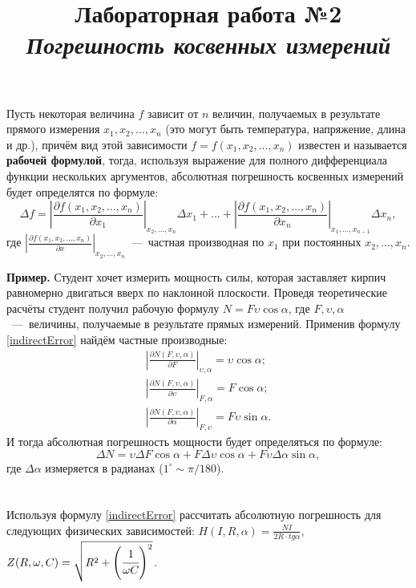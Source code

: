 \documentclass[14pt,a4paper]{article}
\title{Лабораторная работа №2 \\ \textit{Погрешность косвенных измерений}}
\begin{document}
\maketitle
Пусть некоторая величина $f$ зависит от $n$ величин, получаемых в результате прямого измерения  $x_1, x_2, \ldots, x_n$ (это могут быть температура, напряжение, длина и др.), причём вид этой зависимости $f = f(x_1, x_2, \ldots, x_n)$ известен и называется \textbf{рабочей формулой}, тогда, используя выражение для полного дифференциала функции нескольких аргументов, абсолютная погрешность косвенных измерений будет определятся по формуле:
\begin{equation} \label{indirectError}
    \Delta f = \left | \frac{\partial f(x_1, x_2, \ldots, x_n)}{\partial x_1} \right |_{x_2, \ldots, x_n} \Delta x_1 + \ldots + \left | \frac{\partial f(x_1, x_2, \ldots, x_n)}{\partial x_n} \right |_{x_1, \ldots, x_{n-1}} \Delta x_n,
\end{equation}
где $\left | \frac{\partial f(x_1, x_2, \ldots, x_n)}{\partial x} \right |_{x_2, \ldots, x_n}$~---~частная производная по $x_1$ при постоянных $x_2, \ldots, x_n$.

\textbf{Пример.}
Студент хочет измерить мощность силы, которая заставляет кирпич равномерно двигаться вверх по наклонной плоскости. Проведя теоретические расчёты студент получил рабочую формулу $N = F\upsilon\cos{\alpha}$, где $F, \upsilon, \alpha$~---~величины, получаемые в результате прямых измерений. Применив формулу \ref{indirectError} найдём частные производные:
\begin{gather*}
    \left | \frac{\partial N(F, \upsilon, \alpha)}{\partial F} \right |_{\upsilon, \alpha} = \upsilon\cos{\alpha} ; \\
    \left | \frac{\partial N(F, \upsilon, \alpha)}{\partial \upsilon} \right |_{F, \alpha} = F\cos{\alpha} ; \\
    \left | \frac{\partial N(F, \upsilon, \alpha)}{\partial \alpha} \right |_{F, \upsilon} = F\upsilon\sin{\alpha}.
\end{gather*}
И тогда абсолютная погрешность мощности будет определяться по формуле:
\begin{equation*}
    \Delta N = \upsilon\Delta F\cos{\alpha} + F\Delta \upsilon\cos{\alpha} + F\upsilon\Delta\alpha\sin{\alpha},
\end{equation*}
где $\Delta\alpha$ измеряется в радианах ($1^\circ \sim \pi/180$).
\progress{}
\section{}
Используя формулу \ref{indirectError} рассчитать абсолютную погрешность для следующих физических зависимостей:
$H(I,R,\alpha) = \frac{NI}{2R\cdot tg\alpha}$, $Z(R,\omega, C) = \sqrt{R^2+\left (\cfrac{1}{\omega C} \right )^2}$. \\
\end{document}
